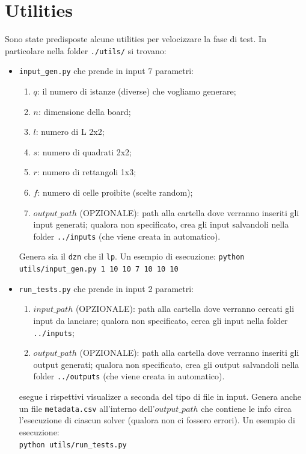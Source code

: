 \documentclass{article}
\begin{document}
\section{Utilities}
Sono state predisposte alcune utilities per velocizzare la fase di test. In particolare nella folder \texttt{./utils/} si trovano:
\begin{itemize}
    \item \texttt{input\_gen.py} che prende in input 7 parametri:
          \begin{enumerate}
              \item $q$: il numero di istanze (diverse) che vogliamo generare;
              \item $n$: dimensione della board;
              \item $l$: numero di L 2x2;
              \item $s$: numero di quadrati 2x2;
              \item $r$: numero di rettangoli 1x3;
              \item $f$: numero di celle proibite (scelte random);
              \item $output\_path$ (OPZIONALE): path alla cartella dove verranno inseriti gli input generati; qualora non specificato, crea gli input salvandoli nella folder \texttt{../inputs} (che viene creata in automatico).
          \end{enumerate}
          Genera sia il \texttt{dzn} che il \texttt{lp}. Un esempio di esecuzione:
          \texttt{python utils/input\_gen.py 1 10 10 7 10 10 10} 
    \item \texttt{run\_tests.py} che prende in input 2 parametri:
          \begin{enumerate}
              \item $input\_path$ (OPZIONALE): path alla cartella dove verranno cercati gli input da lanciare; qualora non specificato, cerca gli input nella folder \texttt{../inputs};
              \item $output\_path$ (OPZIONALE): path alla cartella dove verranno inseriti gli output generati; qualora non specificato, crea gli output salvandoli nella folder \texttt{../outputs} (che viene creata in automatico).
          \end{enumerate}
          esegue i rispettivi visualizer a seconda del tipo di file in input. Genera anche un file \texttt{metadata.csv} all'interno dell'$output\_path$ che contiene le info circa l'esecuzione di ciascun solver (qualora non ci fossero errori). Un esempio di esecuzione:\\
          \texttt{python utils/run\_tests.py}
\end{itemize}
\end{document}
